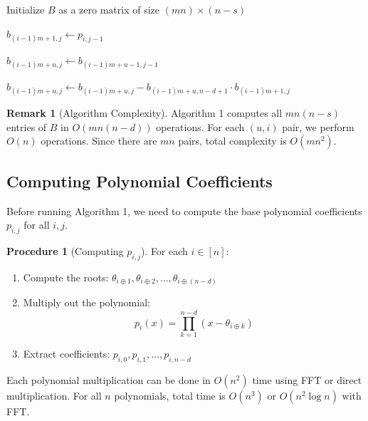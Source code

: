 \documentclass{report}
\theoremstyle{definition}
\newtheorem{remark}[definition]{Remark}
\newtheorem{procedure}[definition]{Procedure}
\begin{document}
\begin{algorithm}[H]
\caption{Efficient Computation of Matrix $B$}
\label{alg:compute_B}
\begin{algorithmic}[1]

\State Initialize $B$ as a zero matrix of size $(mn) \times (n-s)$

        \State $b_{(i-1)m+1,j} \gets p_{i,j-1}$
    \EndFor
\EndFor

            \State $b_{(i-1)m+u,j} \gets b_{(i-1)m+u-1,j-1}$
        \EndFor
        
            \State $b_{(i-1)m+u,j} \gets b_{(i-1)m+u,j} - b_{(i-1)m+u,n-d+1} \cdot b_{(i-1)m+1,j}$
        \EndFor
    \EndFor
\EndFor

\end{algorithmic}
\end{algorithm}

\begin{remark}[Algorithm Complexity]
Algorithm 1 computes all $mn(n-s)$ entries of $B$ in $O(mn(n-d))$ operations. For each $(u, i)$ pair, we perform $O(n)$ operations. Since there are $mn$ pairs, total complexity is $O(mn^2)$.
\end{remark}

\subsection{Computing Polynomial Coefficients}

Before running Algorithm 1, we need to compute the base polynomial coefficients $p_{i,j}$ for all $i, j$.

\begin{procedure}[Computing $p_{i,j}$]

For each $i \in [n]$:

\begin{enumerate}
    \item Compute the roots: $\theta_{i \oplus 1}, \theta_{i \oplus 2}, \ldots, \theta_{i \oplus (n-d)}$
    
    \item Multiply out the polynomial:
    \begin{equation}
    p_i(x) = \prod_{k=1}^{n-d} (x - \theta_{i \oplus k})
    \end{equation}
    
    \item Extract coefficients: $p_{i,0}, p_{i,1}, \ldots, p_{i,n-d}$
\end{enumerate}

Each polynomial multiplication can be done in $O(n^2)$ time using FFT or direct multiplication. For all $n$ polynomials, total time is $O(n^3)$ or $O(n^2 \log n)$ with FFT.

\end{procedure}
\end{document}
